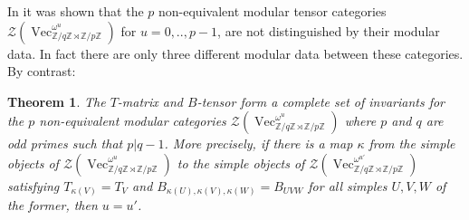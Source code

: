 \documentclass[11pt]{book}
\newtheorem{Thm}{Theorem}[section]
\theoremstyle{Rem}
\theoremstyle{definition}
\numberwithin{equation}{section}
\newcommand\Vect{\operatorname{Vec}}
\newcommand\ZZ{\mathbb Z}
\newcommand\CTR{\mathcal Z}
\newcommand\semdir{\rtimes}
\begin{document}
In \cite{2017arXiv170802796M} it was shown that the $p$ non-equivalent modular tensor categories  $\CTR(\Vect_{\ZZ/q\ZZ \semdir \ZZ/p\ZZ}^{\omega^u})$ for $u=0,..,p-1$, are not distinguished by their modular data. In fact there are only three different modular data between these categories. By contrast:
\begin{Thm}\label{mainthm}
The $T$-matrix and $B$-tensor form a complete set of invariants for the $p$ non-equivalent modular categories $\CTR(\Vect_{\ZZ/q\ZZ \semdir \ZZ/p\ZZ}^{\omega^u})$ where $p$ and $q$ are odd primes such that $p|q-1$. More precisely, if there is a map $\kappa$ from the simple objects of $\CTR(\Vect_{\ZZ/q\ZZ \semdir \ZZ/p\ZZ}^{\omega^u})$ to the simple objects of $\CTR(\Vect_{\ZZ/q\ZZ \semdir \ZZ/p\ZZ}^{\omega^{u'}})$ satisfying $T_{\kappa(V)}=T_{V}$ and $B_{\kappa(U),\kappa(V),\kappa(W)}=B_{UVW}$ for all simples $U,V,W$ of the former, then $u=u'$.
\end{Thm}
\end{document}
